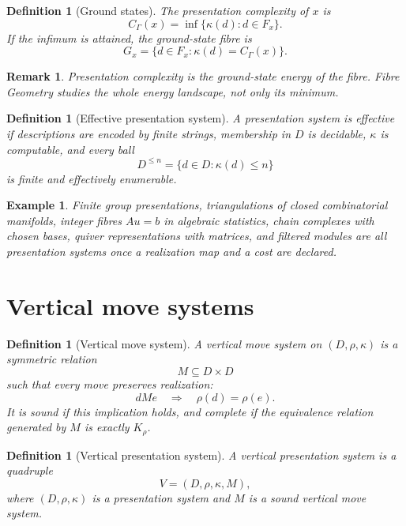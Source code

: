\documentclass[11pt]{article}
\newtheorem{definition}[theorem]{Definition}
\newtheorem{remark}[theorem]{Remark}
\newtheorem{example}[theorem]{Example}
\begin{document}
\begin{definition}[Ground states]
The presentation complexity of \(x\) is
\[
C_\Gamma(x)=\inf\{\kappa(d):d\in F_x\}.
\]
If the infimum is attained, the ground-state fibre is
\[
G_x=\{d\in F_x:\kappa(d)=C_\Gamma(x)\}.
\]
\end{definition}

\begin{remark}
Presentation complexity is the ground-state energy of the fibre.  Fibre Geometry studies the whole energy landscape, not only its minimum.
\end{remark}

\begin{definition}[Effective presentation system]
A presentation system is effective if descriptions are encoded by finite strings, membership in \(D\) is decidable, \(\kappa\) is computable, and every ball
\[
D^{\le n}=\{d\in D:\kappa(d)\le n\}
\]
is finite and effectively enumerable.
\end{definition}

\begin{example}
Finite group presentations, triangulations of closed combinatorial manifolds, integer fibres \(A u=b\) in algebraic statistics, chain complexes with chosen bases, quiver representations with matrices, and filtered modules are all presentation systems once a realization map and a cost are declared.
\end{example}

\section{Vertical move systems}

\begin{definition}[Vertical move system]
A vertical move system on \((D,\rho,\kappa)\) is a symmetric relation
\[
M\subseteq D\times D
\]
such that every move preserves realization:
\[
dMe\quad\Longrightarrow\quad \rho(d)=\rho(e).
\]
It is sound if this implication holds, and complete if the equivalence relation generated by \(M\) is exactly \(K_\rho\).
\end{definition}

\begin{definition}[Vertical presentation system]
A vertical presentation system is a quadruple
\[
V=(D,\rho,\kappa,M),
\]
where \((D,\rho,\kappa)\) is a presentation system and \(M\) is a sound vertical move system.
\end{definition}
\end{document}
